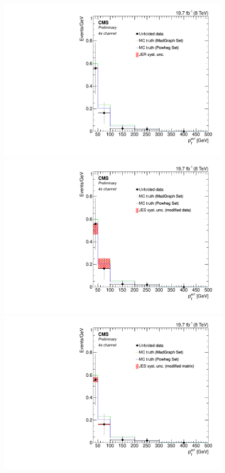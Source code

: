 \begin{figure}[hbtp]
\begin{center}
   \includegraphics[width=0.8\cmsFigWidth]{Figures/Unfolding/Systematics/ZZTo4e_PtJet1_JER_Mad_fr}
   \includegraphics[width=0.8\cmsFigWidth]{Figures/Unfolding/Systematics/ZZTo4e_PtJet1_JES_ModData_Mad_fr}     
   \includegraphics[width=0.8\cmsFigWidth]{Figures/Unfolding/Systematics/ZZTo4e_PtJet1_JES_ModMat_Mad_fr}

\end{center}
\end{figure}
